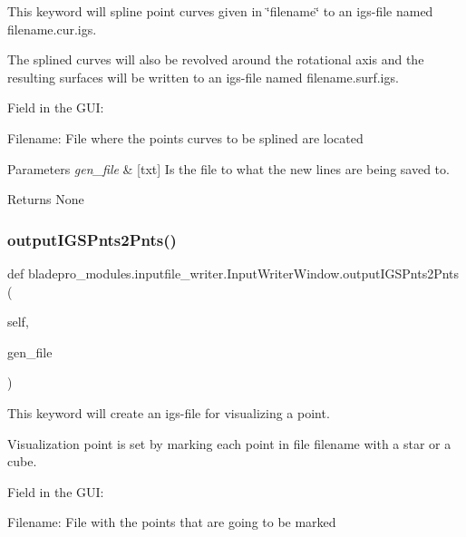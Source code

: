 This keyword will spline point curves given in \char`\"{}filename\char`\"{} to an igs-\/file named filename.\+cur.\+igs. 

The splined curves will also be revolved around the rotational axis and the resulting surfaces will be written to an igs-\/file named filename.\+surf.\+igs.

Field in the G\+UI\+: \begin{DoxyItemize}
\item {\ttfamily Filename\+:} File where the points curves to be splined are located\end{DoxyItemize}

\begin{DoxyParams}{Parameters}
{\em gen\+\_\+file} & \mbox{[}txt\mbox{]} Is the file to what the new lines are being saved to. \\
\hline
\end{DoxyParams}
\begin{DoxyReturn}{Returns}
None 
\end{DoxyReturn}
\hypertarget{a00073_a07862d0aa6332b54008342a24c2e30a3}{}\label{a00073_a07862d0aa6332b54008342a24c2e30a3} 
\subsubsection{\texorpdfstring{output\+I\+G\+S\+Pnts2\+Pnts()}{outputIGSPnts2Pnts()}}
{\footnotesize\ttfamily def bladepro\+\_\+modules.\+inputfile\+\_\+writer.\+Input\+Writer\+Window.\+output\+I\+G\+S\+Pnts2\+Pnts (\begin{DoxyParamCaption}\item[{}]{self,  }\item[{}]{gen\+\_\+file }\end{DoxyParamCaption})}



This keyword will create an igs-\/file for visualizing a point. 

Visualization point is set by marking each point in file filename with a star or a cube.

Field in the G\+UI\+: \begin{DoxyItemize}
\item {\ttfamily Filename\+:} File with the points that are going to be marked\end{DoxyItemize}


